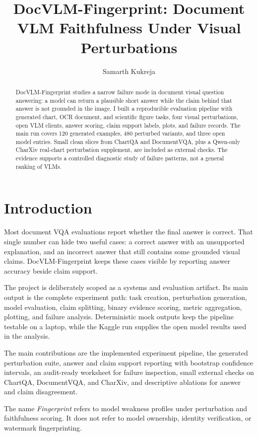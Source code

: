 \documentclass{article}
\title{DocVLM-Fingerprint: Document VLM Faithfulness Under Visual Perturbations}
\author{Samarth Kukreja}
\date{}
\begin{document}
\maketitle

\begin{abstract}
DocVLM-Fingerprint studies a narrow failure mode in document visual question answering: a model can return a plausible short answer while the claim behind that answer is not grounded in the image. I built a reproducible evaluation pipeline with generated chart, OCR document, and scientific figure tasks, four visual perturbations, open VLM clients, answer scoring, claim support labels, plots, and failure records. The main run covers 120 generated examples, 480 perturbed variants, and three open model entries. Small clean slices from ChartQA and DocumentVQA, plus a Qwen-only CharXiv real-chart perturbation supplement, are included as external checks. The evidence supports a controlled diagnostic study of failure patterns, not a general ranking of VLMs.
\end{abstract}

\section{Introduction}

Most document VQA evaluations report whether the final answer is correct. That single number can hide two useful cases: a correct answer with an unsupported explanation, and an incorrect answer that still contains some grounded visual claims. DocVLM-Fingerprint keeps these cases visible by reporting answer accuracy beside claim support.

The project is deliberately scoped as a systems and evaluation artifact. Its main output is the complete experiment path: task creation, perturbation generation, model evaluation, claim splitting, binary evidence scoring, metric aggregation, plotting, and failure analysis. Deterministic mock outputs keep the pipeline testable on a laptop, while the Kaggle run supplies the open model results used in the analysis.

The main contributions are the implemented experiment pipeline, the generated perturbation suite, answer and claim support reporting with bootstrap confidence intervals, an audit-ready worksheet for failure inspection, small external checks on ChartQA, DocumentVQA, and CharXiv, and descriptive ablations for answer and claim disagreement.

The name \emph{Fingerprint} refers to model weakness profiles under perturbation and faithfulness scoring. It does not refer to model ownership, identity verification, or watermark fingerprinting.
\end{document}
